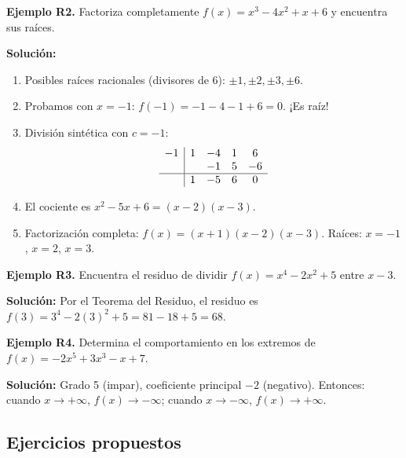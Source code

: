 \documentclass[12pt, letterpaper]{article}
\begin{document}
\newpage

\textbf{Ejemplo R2.} Factoriza completamente $f(x) = x^3 - 4x^2 + x + 6$ y encuentra sus raíces.

\begin{cuadrosolucion}
  \textbf{Solución:}
  \begin{enumerate}
    \item Posibles raíces racionales (divisores de 6): $\pm 1, \pm 2, \pm 3, \pm 6$.
    \item Probamos con $x = -1$: $f(-1) = -1 - 4 - 1 + 6 = 0$. ¡Es raíz!
    \item División sintética con $c = -1$:
          \[
            \begin{array}{c|cccc}
              -1 & 1 & -4 & 1 & 6  \\
                 &   & -1 & 5 & -6 \\
              \hline
                 & 1 & -5 & 6 & 0  \\
            \end{array}
          \]
    \item El cociente es $x^2 - 5x + 6 = (x - 2)(x - 3)$.
    \item Factorización completa: $f(x) = (x + 1)(x - 2)(x - 3)$. Raíces: $x = -1$, $x = 2$, $x = 3$.
  \end{enumerate}
\end{cuadrosolucion}

\textbf{Ejemplo R3.} Encuentra el residuo de dividir $f(x) = x^4 - 2x^2 + 5$ entre $x - 3$.

\begin{cuadrosolucion}
  \textbf{Solución:} Por el Teorema del Residuo, el residuo es $f(3) = 3^4 - 2(3)^2 + 5 = 81 - 18 + 5 = 68$.
\end{cuadrosolucion}

\textbf{Ejemplo R4.} Determina el comportamiento en los extremos de $f(x) = -2x^5 + 3x^3 - x + 7$.

\begin{cuadrosolucion}
  \textbf{Solución:} Grado 5 (impar), coeficiente principal $-2$ (negativo). Entonces: cuando $x \to +\infty$, $f(x) \to -\infty$; cuando $x \to -\infty$, $f(x) \to +\infty$.
\end{cuadrosolucion}

\subsection{Ejercicios propuestos}
\end{document}
